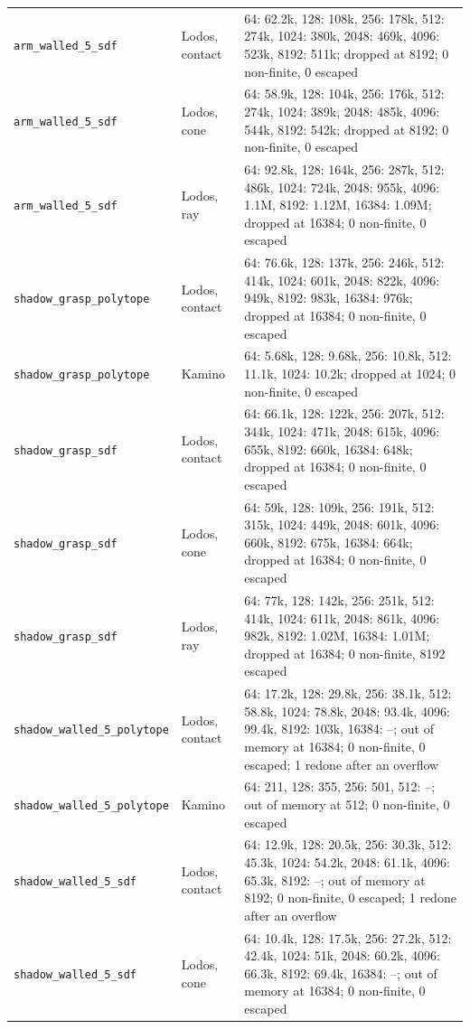 \begin{longtable}{@{}llp{9.5cm}@{}}
\texttt{arm\_walled\_5\_sdf} & Lodos, contact & 64: 62.2k, 128: 108k, 256: 178k, 512: 274k, 1024: 380k, 2048: 469k, 4096: 523k, 8192: 511k; dropped at 8192; 0 non-finite, 0 escaped \\
\texttt{arm\_walled\_5\_sdf} & Lodos, cone & 64: 58.9k, 128: 104k, 256: 176k, 512: 274k, 1024: 389k, 2048: 485k, 4096: 544k, 8192: 542k; dropped at 8192; 0 non-finite, 0 escaped \\
\texttt{arm\_walled\_5\_sdf} & Lodos, ray & 64: 92.8k, 128: 164k, 256: 287k, 512: 486k, 1024: 724k, 2048: 955k, 4096: 1.1M, 8192: 1.12M, 16384: 1.09M; dropped at 16384; 0 non-finite, 0 escaped \\
\texttt{shadow\_grasp\_polytope} & Lodos, contact & 64: 76.6k, 128: 137k, 256: 246k, 512: 414k, 1024: 601k, 2048: 822k, 4096: 949k, 8192: 983k, 16384: 976k; dropped at 16384; 0 non-finite, 0 escaped \\
\texttt{shadow\_grasp\_polytope} & Kamino & 64: 5.68k, 128: 9.68k, 256: 10.8k, 512: 11.1k, 1024: 10.2k; dropped at 1024; 0 non-finite, 0 escaped \\
\texttt{shadow\_grasp\_sdf} & Lodos, contact & 64: 66.1k, 128: 122k, 256: 207k, 512: 344k, 1024: 471k, 2048: 615k, 4096: 655k, 8192: 660k, 16384: 648k; dropped at 16384; 0 non-finite, 0 escaped \\
\texttt{shadow\_grasp\_sdf} & Lodos, cone & 64: 59k, 128: 109k, 256: 191k, 512: 315k, 1024: 449k, 2048: 601k, 4096: 660k, 8192: 675k, 16384: 664k; dropped at 16384; 0 non-finite, 0 escaped \\
\texttt{shadow\_grasp\_sdf} & Lodos, ray & 64: 77k, 128: 142k, 256: 251k, 512: 414k, 1024: 611k, 2048: 861k, 4096: 982k, 8192: 1.02M, 16384: 1.01M; dropped at 16384; 0 non-finite, 8192 escaped \\
\texttt{shadow\_walled\_5\_polytope} & Lodos, contact & 64: 17.2k, 128: 29.8k, 256: 38.1k, 512: 58.8k, 1024: 78.8k, 2048: 93.4k, 4096: 99.4k, 8192: 103k, 16384: --; out of memory at 16384; 0 non-finite, 0 escaped; 1 redone after an overflow \\
\texttt{shadow\_walled\_5\_polytope} & Kamino & 64: 211, 128: 355, 256: 501, 512: --; out of memory at 512; 0 non-finite, 0 escaped \\
\texttt{shadow\_walled\_5\_sdf} & Lodos, contact & 64: 12.9k, 128: 20.5k, 256: 30.3k, 512: 45.3k, 1024: 54.2k, 2048: 61.1k, 4096: 65.3k, 8192: --; out of memory at 8192; 0 non-finite, 0 escaped; 1 redone after an overflow \\
\texttt{shadow\_walled\_5\_sdf} & Lodos, cone & 64: 10.4k, 128: 17.5k, 256: 27.2k, 512: 42.4k, 1024: 51k, 2048: 60.2k, 4096: 66.3k, 8192: 69.4k, 16384: --; out of memory at 16384; 0 non-finite, 0 escaped \\

\end{longtable}
